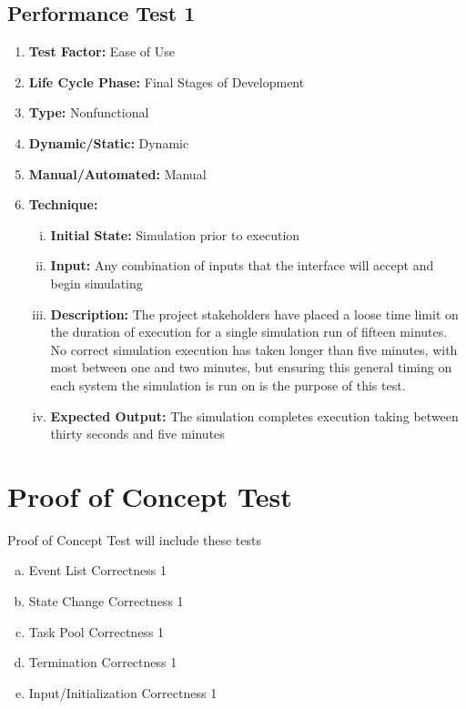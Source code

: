 \documentclass[paper=letter, fontsize=10pt]{scrartcl}
\numberwithin{equation}{section}		%
\numberwithin{figure}{section}			%
\numberwithin{table}{section}				%
\begin{document}
\subsection{Performance Test 1}
\begin{enumerate}[]
	\item \textbf{Test Factor:} Ease of Use
	\item \textbf{Life Cycle Phase:} Final Stages of Development
	\item \textbf{Type:} Nonfunctional
	\item \textbf{Dynamic/Static:} Dynamic
	\item \textbf{Manual/Automated:} Manual
	\item \textbf{Technique:}
		\begin{enumerate}[(i)]
			\item \textbf{Initial State:} Simulation prior to execution  
			\item \textbf{Input:} Any combination of inputs that the interface will accept and begin simulating
			\item \textbf{Description:} The project stakeholders have placed a loose time limit on the duration of execution for a single simulation run of fifteen minutes. No correct simulation execution has taken longer than five minutes, with most between one and two minutes, but ensuring this general timing on each system the simulation is run on is the purpose of this test.
			\item \textbf{Expected Output:} The simulation completes execution taking between thirty seconds and five minutes 
		\end{enumerate}
\end{enumerate}

\section{Proof of Concept Test}
Proof of Concept Test will include these tests
\begin{enumerate}[(a)]
	\item Event List Correctness 1
	\item State Change Correctness 1
	\item Task Pool Correctness 1
	\item Termination Correctness 1
	\item Input/Initialization Correctness 1
\end{enumerate}
\end{document}
